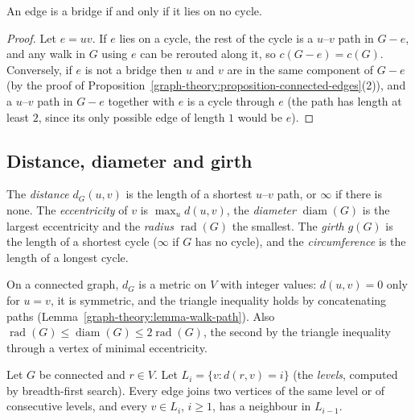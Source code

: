 \begin{proposition}\label{graph-theory:proposition-bridge}
An edge is a bridge if and only if it lies on no cycle.
\end{proposition}

\begin{proof}
Let $e = uv$. If $e$ lies on a cycle, the rest of the cycle is a $u$--$v$ path in $G - e$, and any walk in $G$ using $e$ can be rerouted along it, so $c(G - e) = c(G)$. Conversely, if $e$ is not a
bridge then $u$ and $v$ are in the same component of $G - e$ (by the proof of Proposition~\ref{graph-theory:proposition-connected-edges}(2)), and a $u$--$v$ path in $G - e$ together with $e$
is a cycle through $e$ (the path has length at least $2$, since its only possible edge of length $1$ would be $e$).
\end{proof}

\subsection{Distance, diameter and girth}\label{graph-theory:subsection-distance}

\begin{definition}\label{graph-theory:definition-distance}
The \emph{distance} $d_G(u, v)$ is the length of a shortest $u$--$v$ path, or $\infty$ if there is none. The \emph{eccentricity} of $v$ is $\max_ud(u, v)$, the \emph{diameter}
$\operatorname{diam}(G)$ is the largest eccentricity and the \emph{radius} $\operatorname{rad}(G)$ the smallest. The \emph{girth} $g(G)$ is the length of a shortest cycle ($\infty$ if $G$ has
no cycle), and the \emph{circumference} is the length of a longest cycle.
\end{definition}

On a connected graph, $d_G$ is a metric on $V$ with integer values: $d(u, v) = 0$ only for $u = v$, it is symmetric, and the triangle inequality holds by concatenating paths
(Lemma~\ref{graph-theory:lemma-walk-path}). Also $\operatorname{rad}(G) \leq \operatorname{diam}(G) \leq 2\operatorname{rad}(G)$, the second by the triangle inequality through a vertex of
minimal eccentricity.

\begin{proposition}\label{graph-theory:proposition-bfs}
Let $G$ be connected and $r \in V$. Let $L_i = \{v : d(r, v) = i\}$ (the \emph{levels}, computed by breadth-first search). Every edge joins two vertices of the same level or of consecutive
levels, and every $v \in L_i$, $i \geq 1$, has a neighbour in $L_{i-1}$.
\end{proposition}

